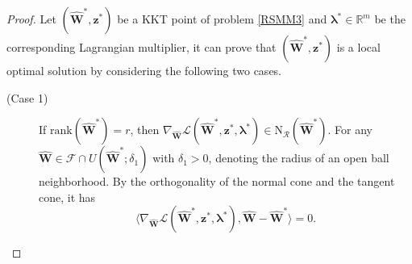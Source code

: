 \documentclass[sn-mathphys]{JORSC-jnl}%
\theoremstyle{thmstyleone}%
\theoremstyle{thmstylethree}%
\theoremstyle{thmstyleone} %
\begin{document}
\begin{proof}
	Let $(\hat{\mathbf{W}}^*,\mathbf{z}^*)$ be a KKT point of problem \eqref{RSMM3} and $\bm{\lambda}^*\in\mathbb{R}^m$ be the corresponding Lagrangian multiplier, it can prove that $(\hat{\mathbf{W}}^*,\mathbf{z}^*)$ is a local optimal solution by considering the following two cases. 
\begin{description}
    \item[(Case 1)] If $\text{rank}(\hat{\mathbf{W}}^*)=r$, then $\nabla_{\hat{\mathbf{W}}} \mathscr{L}(\hat{\mathbf{W}}^{*},\mathbf{z}^*,\bm{\lambda}^{*})\in\mathrm{N}_{\mathcal{R}}(\hat{\mathbf{W}}^*)$. For any $\hat{\mathbf{W}}\in\mathcal{F}\cap U(\hat{\mathbf{W}}^*;\delta_1)$ with  $\delta_1>0$, denoting the radius of an open ball neighborhood. 
    By the orthogonality of the normal cone and the tangent cone, it has
    \begin{equation}\label{W22}
\langle\nabla_{\hat{\mathbf{W}}} \mathscr{L}(\hat{\mathbf{W}}^*,\mathbf{z}^*,\bm{\lambda}^*),\hat{\mathbf{W}}-\hat{\mathbf{W}}^*\rangle= 0.
	\end{equation}
    

\end{description}
\end{proof}
\end{document}
